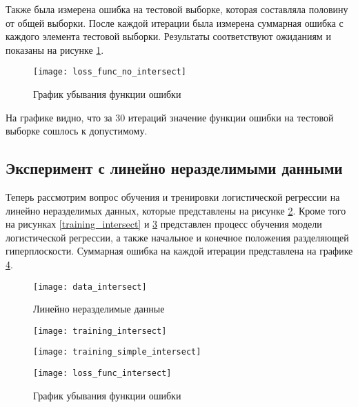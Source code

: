 \clearpage
Также была измерена ошибка на тестовой выборке, которая составляла половину от общей выборки. После каждой итерации была измерена суммарная ошибка с каждого элемента тестовой выборки. Результаты соответствуют ожиданиям и показаны на рисунке \ref{loss_func_no_intersect}.

\begin{figure}[h]
    \centering
    \texttt{[image: loss\_func\_no\_intersect]}
    \caption{График убывания функции ошибки}
    \label{loss_func_no_intersect}
\end{figure}

На графике видно, что за 30 итераций значение функции ошибки на тестовой выборке сошлось к допустимому.

\subsection{Эксперимент с линейно неразделимыми данными}
Теперь рассмотрим вопрос обучения и тренировки логистической регрессии на линейно неразделимых данных, которые представлены на рисунке \ref{data_intersect}. Кроме того на рисунках \ref{training_intersect} и \ref{training_simple_intersect} представлен процесс обучения модели логистической регрессии, а также начальное и конечное положения разделяющей гиперплоскости. Суммарная ошибка на каждой итерации представлена на графике \ref{loss_func_intersect}.

\begin{figure}[h]
    \centering
    \texttt{[image: data\_intersect]}
    \caption{Линейно неразделимые данные}
    \label{data_intersect}
\end{figure}

\begin{figure}
\centering
\begin{minipage}{.5\textwidth}
  \centering
  \texttt{[image: training\_intersect]}
  \label{training_intersect}
\end{minipage}%
\begin{minipage}{.5\textwidth}
  \centering
  \texttt{[image: training\_simple\_intersect]}
  \label{training_simple_intersect}
\end{minipage}
\end{figure}


\begin{figure}[h]
    \centering
    \texttt{[image: loss\_func\_intersect]}
    \caption{График убывания функции ошибки}
    \label{loss_func_intersect}
\end{figure}